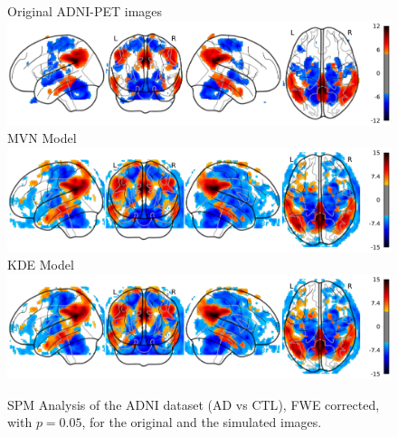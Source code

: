 \begin{figure}
	\centering
	Original ADNI-PET images\\
	\includegraphics[width=\linewidth]{Graphics/ch8/NORvsAD_Orig_glass}\\
	\ac{MVN} Model\\
	\includegraphics[width=\linewidth]{Graphics/ch8/NORvsAD_MVN_glass}\\
	\ac{KDE} Model\\
	\includegraphics[width=\linewidth]{Graphics/ch8/NORvsAD_KDE_glass}
	\caption[\acs{SPM} Analysis of the ADNI dataset (\acs{AD} vs \acs{CTL}).]{\ac{SPM} Analysis of the ADNI dataset (\ac{AD} vs \ac{CTL}), \ac{FWE} corrected, with $p=0.05$, for the original and the simulated images.}
	\label{fig:spmAD}
\end{figure}


